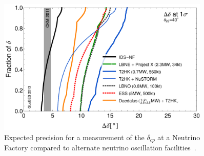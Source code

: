 \begin{figure}[h!]
\centering
\includegraphics[width=0.9\textwidth]{figures/rdr-cp-precision-comparison-131216.pdf}
\caption{Expected precision for a measurement of the $\delta_{cp}$ at a Neutrino Factory compared to alternate neutrino oscillation facilities~\cite{Fix7}.}
\label{fig:nuFactExp}
\end{figure}

